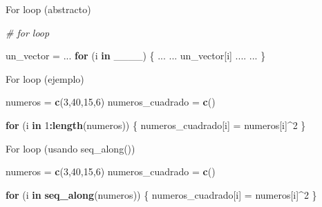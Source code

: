 \documentclass[ignorenonframetext,]{beamer}
\newenvironment{Shaded}{\begin{snugshade}}{\end{snugshade}}
\newcommand{\CommentTok}[1]{\textcolor[rgb]{0.56,0.35,0.01}{\textit{#1}}}
\newcommand{\ControlFlowTok}[1]{\textcolor[rgb]{0.13,0.29,0.53}{\textbf{#1}}}
\newcommand{\DecValTok}[1]{\textcolor[rgb]{0.00,0.00,0.81}{#1}}
\newcommand{\KeywordTok}[1]{\textcolor[rgb]{0.13,0.29,0.53}{\textbf{#1}}}
\newcommand{\NormalTok}[1]{#1}
\newcommand{\OperatorTok}[1]{\textcolor[rgb]{0.81,0.36,0.00}{\textbf{#1}}}
\newcommand{\StringTok}[1]{\textcolor[rgb]{0.31,0.60,0.02}{#1}}
\begin{document}
\begin{frame}[fragile]{For loop (abstracto)}
\protect\hypertarget{for-loop-abstracto}{}

\begin{Shaded}
\begin{Highlighting}[]
\CommentTok{# for loop}

\NormalTok{un_vector =}\StringTok{ }\NormalTok{...}
\ControlFlowTok{for}\NormalTok{ (i }\ControlFlowTok{in}\NormalTok{ ____) \{}
\NormalTok{  ...}
\NormalTok{  ... un_vector[i] ....}
\NormalTok{  ...}
\NormalTok{\}}
\end{Highlighting}
\end{Shaded}

\end{frame}

\begin{frame}[fragile]{For loop (ejemplo)}
\protect\hypertarget{for-loop-ejemplo}{}

\begin{Shaded}
\begin{Highlighting}[]
\NormalTok{numeros =}\StringTok{ }\KeywordTok{c}\NormalTok{(}\DecValTok{3}\NormalTok{,}\DecValTok{40}\NormalTok{,}\DecValTok{15}\NormalTok{,}\DecValTok{6}\NormalTok{)}
\NormalTok{numeros_cuadrado =}\StringTok{ }\KeywordTok{c}\NormalTok{()}

\ControlFlowTok{for}\NormalTok{ (i }\ControlFlowTok{in} \DecValTok{1}\OperatorTok{:}\KeywordTok{length}\NormalTok{(numeros)) \{}
\NormalTok{  numeros_cuadrado[i] =}\StringTok{ }\NormalTok{numeros[i]}\OperatorTok{^}\DecValTok{2}
\NormalTok{\}}
\end{Highlighting}
\end{Shaded}

\end{frame}

\begin{frame}[fragile]{For loop (usando seq\_along())}
\protect\hypertarget{for-loop-usando-seq_along}{}

\begin{Shaded}
\begin{Highlighting}[]
\NormalTok{numeros =}\StringTok{ }\KeywordTok{c}\NormalTok{(}\DecValTok{3}\NormalTok{,}\DecValTok{40}\NormalTok{,}\DecValTok{15}\NormalTok{,}\DecValTok{6}\NormalTok{)}
\NormalTok{numeros_cuadrado =}\StringTok{ }\KeywordTok{c}\NormalTok{()}

\ControlFlowTok{for}\NormalTok{ (i }\ControlFlowTok{in} \KeywordTok{seq_along}\NormalTok{(numeros)) \{}
\NormalTok{  numeros_cuadrado[i] =}\StringTok{ }\NormalTok{numeros[i]}\OperatorTok{^}\DecValTok{2}
\NormalTok{\}}
\end{Highlighting}
\end{Shaded}

\end{frame}
\end{document}
